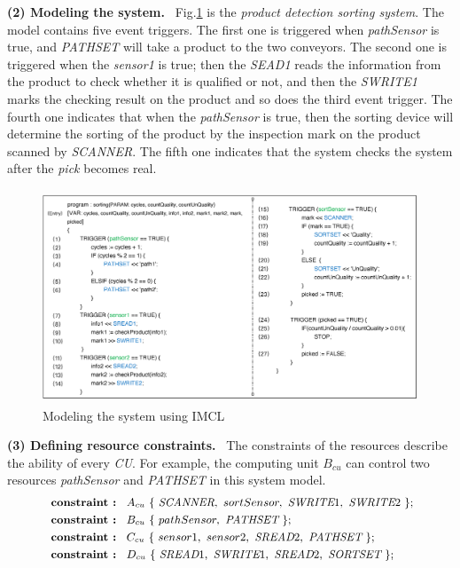 \textbf{(2) Modeling the system.} \ Fig.\ref{fig_IMCL_code} is the \emph{product detection sorting system}. The model contains five event triggers. The first one is triggered when \emph{pathSensor} is true, and \emph{PATHSET} will take a product to the two conveyors. The second one is triggered when the \emph{sensor1} is true; then the \emph{SEAD1} reads the information from the product to check whether it is qualified or not, and then the \emph{SWRITE1} marks the checking result on the product and so does the third event trigger. The fourth one indicates that when the \emph{pathSensor} is true, then the sorting device will determine the sorting of the product by the inspection mark on the product scanned by \emph{SCANNER}. The fifth one indicates that the system checks the system after the \emph{pick} becomes real.
\begin{figure}[!hpbt]
    \centering
        \includegraphics[height=2.5in, width=4.4in]{fig_IMCL_code}
    \caption{Modeling the system using IMCL}\label{fig_IMCL_code}
\end{figure}

\textbf{(3) Defining resource constraints.} \ The constraints of the resources describe the ability of every \emph{CU}. For example, the computing unit $B_{cu}$ can control two resources \emph{pathSensor} and \emph{PATHSET} in this system model.
\begin{equation*}
\footnotesize
    \begin{aligned}
        \ \textbf{constraint : \ } & \textbf{$A_{cu}$} \ \{ \ \emph{SCANNER}, \ sortSensor, \ \emph{SWRITE}1, \ \emph{SWRITE}2 \ \};\\
        \ \textbf{constraint : \ } & \textbf{$B_{cu}$} \ \{ \ pathSensor, \ \emph{PATHSET} \ \};\\
        \ \textbf{constraint : \ } & \textbf{$C_{cu}$} \ \{ \ sensor1, \ sensor2, \ \emph{SREAD}2, \ \emph{PATHSET} \ \};\\
        \ \textbf{constraint : \ } & \textbf{$D_{cu}$} \ \{ \ \emph{SREAD}1, \ \emph{SWRITE}1, \ \emph{SREAD}2, \ \emph{SORTSET} \ \};
    \end{aligned}
\end{equation*}
  
